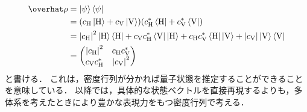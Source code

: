 \documentclass{report}
\begin{document}
    \begin{align}
      \hat{\rho} &= \ket{\psi}\bra{\psi} \\ 
      &= \qty(c_{\r{H}}\ketH + c_{\r{V}}\ketV)\qty(c^*_{\r{H}}\braH + c^*_{\r{V}}\braV) \\ 
      &= \abs{c_{\r{H}}}^2 \ketH\braH + c_{\r{V}}c^*_{\r{H}}\braV\ketH + c_{\r{H}}c^*_{\r{V}}\braH\ketV + \abs{c_{\r{V}}}\ketV\braV \\ 
      &= \mqty(\abs{c_{\r{H}}}^2 & c_{\r{H}}c^*_{\r{V}} \\ c_{\r{V}}c^*_{\r{H}} & \abs{c_{\r{V}}}^2) \label{stete-vector-1-bit-hv-representation}
    \end{align}
    と書ける．
    これは，密度行列が分かれば量子状態を推定することができることを意味している．
    以降では，具体的な状態ベクトルを直接再現するよりも，多体系を考えたときにより豊かな表現力をもつ密度行列で考える．
\end{document}
